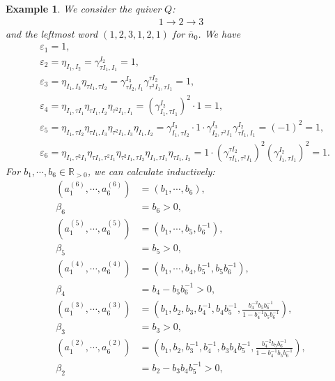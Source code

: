 \documentclass[12pt]{amsart}
\newtheorem{example}[theorem]{Example}
\begin{document}
\begin{example}
    We consider the quiver $Q$:
    \begin{align*}
        1\rightarrow 2 \rightarrow 3
    \end{align*}
    and the leftmost word $(1,2,3,1,2,1)$ for $\overline{n}_0$. 
    We have  
    \begin{align*}
        &\varepsilon_1=1, \\
        & \varepsilon_2=\eta_{I_1,I_2}=\gamma_{\tau I_1,I_1}^{I_2}=1,\\
        &\varepsilon_3 = \eta_{I_1,I_3}\eta_{\tau I_1,\tau I_2}=\gamma_{\tau I_2,I_1}^{I_3}\gamma_{\tau^2 I_1,\tau I_1}^{\tau I_2}=1,\\
        &\varepsilon_4 = \eta_{I_1,\tau I_1}\eta_{\tau I_1,I_2}\eta_{\tau^2 I_1,I_1}=(\gamma_{I_1,\tau I_1}^{I_2} )^2 \cdot 1=1,\\
        &\varepsilon_5 = \eta_{I_1,\tau I_2}\eta_{\tau I_1,I_3}\eta_{\tau^2 I_1,I_3}\eta_{I_1,I_2}=\gamma_{I_1,\tau I_2}^{I_3}\cdot 1 \cdot \gamma_{I_2,\tau^2 I_1}^{I_3} \gamma_{\tau I_1,I_1}^{I_2} = (-1)^2 =1,\\
        &\varepsilon_6 = \eta_{I_1,\tau^2 I_1} \eta_{\tau I_1,\tau^2 I_1} \eta_{\tau^2 I_1,\tau I_2} \eta_{I_1,\tau I_1} \eta_{\tau I_1,I_2} = 1 \cdot (\gamma_{\tau I_1,\tau^2 I_1}^{\tau I_2})^2 (\gamma_{I_1,\tau I_1}^{I_2})^2 = 1.
    \end{align*}
    For $b_1,\cdots,b_6 \in \mathbb{R}_{>0}$, we can calculate inductively:
    \begin{align*}
        (a_1^{(6)},\cdots,a_6^{(6)})&=(b_1,\cdots,b_6),\\
        \beta_6&=b_6>0,\\
        (a_1^{(5)},\cdots,a_6^{(5)})&=(b_1,\cdots,b_5,b_6^{-1}),\\
        \beta_5&=b_5>0,\\
        (a_1^{(4)},\cdots,a_6^{(4)})&=(b_1,\cdots,b_4,b_5^{-1},b_5b_6^{-1}),\\
        \beta_4&=b_4-b_5b_6^{-1}>0,\\
        (a_1^{(3)},\cdots,a_6^{(3)})&=(b_1,b_2,b_3,b_4^{-1},b_4b_5^{-1},\frac{b_4^{-2}b_5b_6^{-1}}{1-b_4^{-1}b_5b_6^{-1}}),\\
        \beta_3&=b_3>0,\\
        (a_1^{(2)},\cdots,a_6^{(2)})&=(b_1,b_2,b_3^{-1},b_4^{-1},b_3b_4b_5^{-1},\frac{b_4^{-2}b_5b_6^{-1}}{1-b_4^{-1}b_5b_6^{-1}}),\\
        \beta_2&=b_2-b_3b_4b_5^{-1}>0,\\

\end{align*}
\end{example}
\end{document}
